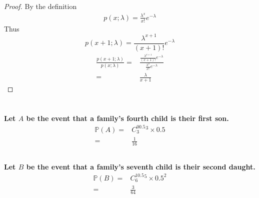 \documentclass{article}
\begin{document}
    \section{}
        \begin{proof}
            By the definition
            \begin{equation*}
                \begin{split}
                    p(x;\lambda)=\frac{\lambda^x}{x!}e^{-\lambda}
                \end{split}
            \end{equation*}
            Thus
            $$p(x+1;\lambda)=\frac{\lambda^{x+1}}{(x+1)!}e^{-\lambda}$$
            \begin{equation*}
                \begin{split}
                    \frac{p(x+1;\lambda)}{p(x;\lambda)}=&\frac{\frac{\lambda^{x+1}}{(x+1)!}e^{-\lambda}}{\frac{\lambda^x}{x!}e^{-\lambda}}\\
                        =&\frac{\lambda}{x+1}
                \end{split}
            \end{equation*}
        \end{proof}
    
    \section{}
        \subsection{}
            \paragraph{
                Let $A$ be the event that a family’s fourth child is their first son.
                \begin{equation*}
                    \begin{split}
                        \mathbb{P}(A)=&C_3^00.5^3\times 0.5\\
                            =&\frac{1}{16}
                    \end{split}
                \end{equation*}
            }
        \subsection{}
            \paragraph{
                Let $B$ be the event that a family’s seventh child is their second daught.
                \begin{equation*}
                    \begin{split}
                        \mathbb{P}(B)=&C_6^10.5^5\times 0.5^2\\
                            =&\frac{3}{64}
                    \end{split}
                \end{equation*}
            }
\end{document}
